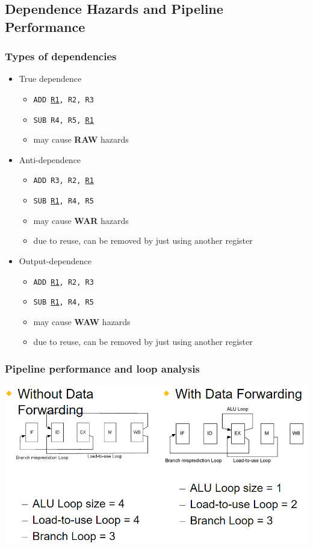 \documentclass[12pt]{extarticle}
\begin{document}
	\subsection{Dependence Hazards and Pipeline Performance}

	\subsubsection{Types of dependencies}

	\begin{itemize}
		\item True dependence
		\begin{itemize}
			\item \texttt{ADD \underline{R1}, R2, R3}
			\item \texttt{SUB R4, R5, \underline{R1}}
			\item may cause \textbf{RAW} hazards
		\end{itemize}

		\item Anti-dependence
		\begin{itemize}
			\item \texttt{ADD R3, R2, \underline{R1}}
			\item \texttt{SUB \underline{R1}, R4, R5}
			\item may cause \textbf{WAR} hazards
			\item due to reuse, can be removed by just using another register
		\end{itemize}

		\item Output-dependence
		\begin{itemize}
			\item \texttt{ADD \underline{R1}, R2, R3}
			\item \texttt{SUB \underline{R1}, R4, R5}
			\item may cause \textbf{WAW} hazards
			\item due to reuse, can be removed by just using another register
		\end{itemize}
	\end{itemize}

	\subsubsection{Pipeline performance and loop analysis}

	\begin{center}
		\includegraphics[scale=0.5]{assets/loop-analysis-ex1.png}
	\end{center}
\end{document}
